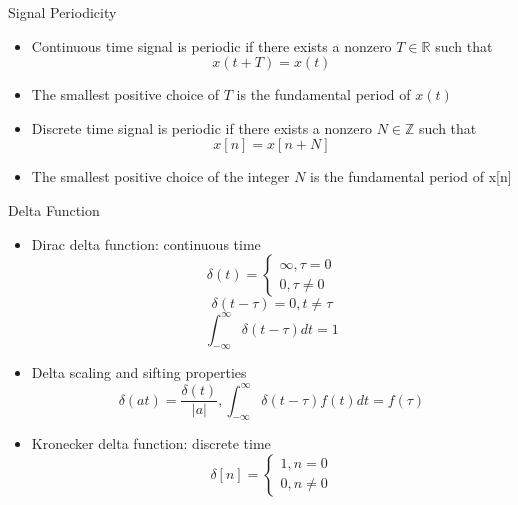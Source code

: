 \begin{frame}{Signal Periodicity}
\begin{itemize}
    \item Continuous time signal is periodic if there exists a nonzero $T \in \mathbb{R}$ such that
    \[
        x(t + T) = x(t)
    \]
    \item The smallest positive choice of $T$ is the fundamental period of $x(t)$
    \item Discrete time signal is periodic if there  exists a nonzero $N \in \mathbb{Z}$ such that
    \[
        x[n] =x[n + N]
    \]
    \item The smallest positive choice of the integer $N$ is the fundamental period of x[n]
\end{itemize}

\end{frame}

\begin{frame}{Delta Function}
\begin{itemize}
    \item Dirac delta function: continuous time
    \[
        \delta(t) =
        \begin{cases}
        \infty, \tau = 0 \\
        0, \tau \neq 0
        \end{cases}
    \]
    \[
    \delta(t - \tau) = 0, t \neq \tau \]
    \[ \int_{-\infty}^{\infty}\delta(t - \tau)dt = 1 \]
    \item Delta scaling and sifting properties
    \[ \delta(at) = \frac{\delta(t)}{|a|}, 
        \int_{-\infty}^{\infty} \delta(t - \tau)f(t)dt = f(\tau)
    \]
    \item Kronecker delta function: discrete time
    \[
      \delta[n] = \begin{cases}
      1, n=0\\
      0, n \neq 0
      \end{cases}
      \]
\end{itemize}

\end{frame}
